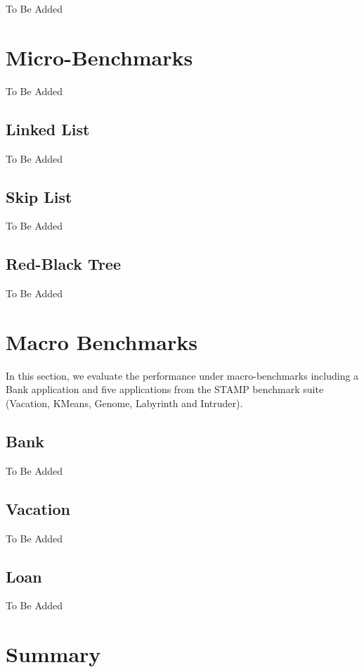 \documentclass[12pt,english]{report}
\begin{document}
To Be Added

\section{Micro-Benchmarks}

To Be Added 

\subsection{Linked List\label{sub:Linked-List}}

To Be Added 

\subsection{Skip List}

To Be Added 

\subsection{Red-Black Tree}

To Be Added 

\section{Macro Benchmarks}

In this section, we evaluate the performance under macro-benchmarks including a Bank application and five applications from the STAMP benchmark suite~\cite{caominh:stamp:iiswc:2008} (Vacation, KMeans, Genome,
Labyrinth and Intruder).

\subsection{Bank}

To Be Added

\subsection{Vacation}

To Be Added

\subsection{Loan}

To Be Added

\section{Summary}
\end{document}
